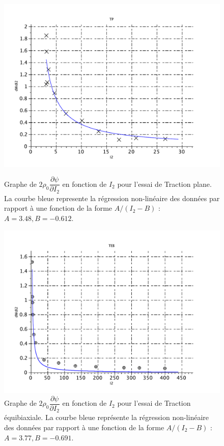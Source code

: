 \documentclass[a4paper,11pt]{article}
\begin{document}
\begin{figure}[!ht]
\begin{minipage}{0.49\linewidth}
	\centering\includegraphics[scale=0.45]{scilab_prof/q412.pdf}
	\caption{Graphe de $2 \rho_0 \dfrac{\partial\psi}{\partial I_2}$ en fonction de $I_2$ pour l'essai de Traction plane. La courbe bleue represente la régression non-linéaire des données par rapport à une fonction de la forme $A/(I_2-B)$ : $A = 3.48, B = -0.612$.}
\label{fig:412}
\end{minipage}
	\hfill
\begin{minipage}{0.49\linewidth}
	\centering\includegraphics[scale=0.45]{scilab_prof/q413.pdf}
	\caption{Graphe de $2 \rho_0 \dfrac{\partial\psi}{\partial I_2}$ en fonction de $I_2$ pour l'essai de Traction équibiaxiale. La courbe bleue représente la régression non-linéaire des données par rapport à une fonction de la forme $A/(I_2-B)$ : $A = 3.77, B = -0.691$.}
\label{fig:413}
\end{minipage}
\end{figure}
\end{document}
